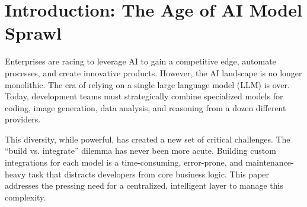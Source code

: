 \documentclass[11pt,a4paper]{article}
\begin{document}
\newpage

\section{Introduction: The Age of AI Model Sprawl}
Enterprises are racing to leverage AI to gain a competitive edge, automate processes, and create innovative products. However, the AI landscape is no longer monolithic. The era of relying on a single large language model (LLM) is over. Today, development teams must strategically combine specialized models for coding, image generation, data analysis, and reasoning from a dozen different providers.

\begin{center}
\end{center}

This diversity, while powerful, has created a new set of critical challenges. The ``build vs. integrate'' dilemma has never been more acute. Building custom integrations for each model is a time-consuming, error-prone, and maintenance-heavy task that distracts developers from core business logic. This paper addresses the pressing need for a centralized, intelligent layer to manage this complexity.
\end{document}
